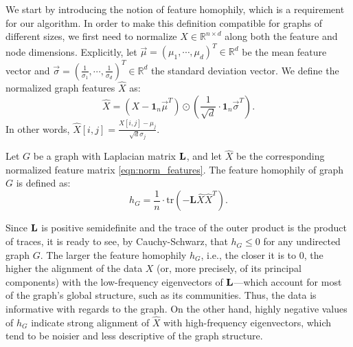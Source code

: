 We start by introducing the notion of feature homophily, which is a requirement for our algorithm.
In order to make this definition compatible for graphs of different sizes, we first need to normalize $X \in \mathbb{R}^{n\times d}$ along both the feature and node dimensions. Explicitly, let $\Vec{\mu} = (\mu_1, \cdots, \mu_d)^T \in \mathbb{R}^d$ be the mean feature vector and $\Vec{\sigma} = (\frac{1}{\sigma_1}, \cdots, \frac{1}{\sigma_d})^T \in \mathbb{R}^d$ the standard deviation vector. We define the normalized graph features $\hat{X}$ as:
\begin{equation} \label{eqn:norm_features}
    \hat{X} = (X - \mathbf{1}_n \Vec{\mu}^T) \odot (\frac{1}{\sqrt{d}} \cdot \mathbf{1}_n \Vec{\sigma}^T) \text{.}
\end{equation}
In other words, $\hat{X}[i,j] = \frac{X[i,j] - \mu_j}{\sqrt{d}\sigma_j}$. 

\begin{definition} \label{def:feature_homophily}
    Let $G$ be a graph with Laplacian matrix ${\mathbf L}$, and let $\hat{X}$ be the corresponding normalized feature matrix \eqref{eqn:norm_features}. The feature homophily of graph $G$ is defined as:
    \begin{equation} \label{eqn:feature_homophily}
        h_G = \frac{1}{n} \cdot \text{tr}(-\mathbf{L}\hat{X}\hat{X}^T)\text{.}
    \end{equation}
\end{definition}


Since ${\mathbf L}$ is positive semidefinite and the trace of the outer product is the product of traces, it is ready to see, by Cauchy-Schwarz, that $h_G \leq 0$ for any undirected graph $G$. The larger the feature homophily $h_G$, i.e., the closer it is to $0$, the higher the alignment of the data $X$ (or, more precisely, of its principal components) with the low-frequency eigenvectors of ${\mathbf L}$---which account for most of the graph's global structure, such as its communities. Thus, the data is informative with regards to the graph. On the other hand, highly negative values of $h_G$ indicate strong alignment of $\hat{X}$ with high-frequency eigenvectors, which tend to be noisier and less descriptive of the graph structure.

